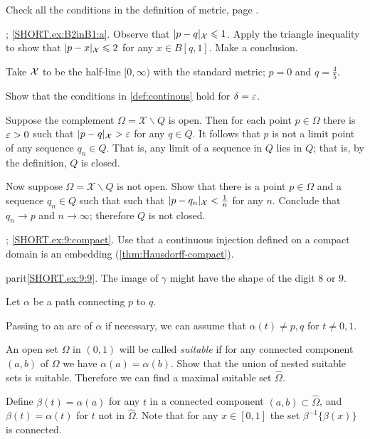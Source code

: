 
\setcounter{eqtn}{0}

 Check all the conditions in the definition of metric, page \pageref{page:def:metric}.

\parbf{\ref{ex:B2inB1}}; \ref{SHORT.ex:B2inB1:a}.
Observe that $|p-q|_{\mathcal{X}}\leqslant 1$. 
Apply the triangle inequality to show that $|p-x|_{\mathcal{X}}\leqslant 2$ for any $x\in B[q,1]$.
Make a conclusion.

 Take $\mathcal{X}$ to be the half-line $[0,\infty)$ with the standard metric; $p=0$ and $q=\tfrac45$.

 Show that the conditions in \ref{def:continous} hold for $\delta=\varepsilon$.

Suppose the complement $\Omega=\mathcal{X}\backslash Q$ is open.
Then for each point $p\in \Omega$ there is $\varepsilon>0$ such that $|p-q|_{\mathcal{X}}>\varepsilon$ for any $q\in Q$.
It follows that $p$ is not a limit point of any sequence $q_n\in Q$.
That is, any limit of a sequence in $Q$ lies in $Q$;
that is, by the definition, $Q$ is closed.

Now suppose $\Omega=\mathcal{X}\backslash Q$ is not open.
Show that there is a point $p\in \Omega$ and a sequence $q_n\in Q$ such that such that $|p-q_n|_{\spc{X}}\z<\tfrac 1n$ for any $n$.
Conclude that $q_n\to p$ and $n\to \infty$;
therefore $Q$ is not closed.


\setcounter{eqtn}{0}

\parbf{\ref{ex:9}}; \ref{SHORT.ex:9:compact}. Use that a continuous injection defined on a compact domain is an embedding (\ref{thm:Hausdorff-compact}).

parit{\ref{SHORT.ex:9:9}.} The image of $\gamma$ might have the shape of the digit $8$ or $9$.



Let $\alpha$ be a path connecting $p$ to $q$.

Passing to an arc of $\alpha$ if necessary,
we can assume that $\alpha(t)\ne p,q$ for $t\ne0,1$.

An open set $\Omega$ in $(0,1)$ will be called {}\emph{suitable}
if for any connected component $(a,b)$ of $\Omega$ we have $\alpha(a)=\alpha(b)$.
Show that the union of nested suitable sets is suitable.
Therefore we can find a maximal suitable set $\hat \Omega$.

Define $\beta(t)=\alpha(a)$ for any $t$ in a connected component $(a,b)\subset\hat \Omega$, and $\beta (t) = \alpha (t) $ for $t$ not in $\hat{\Omega}$.
Note that for any $x\in [0,1]$ the set $\beta^{-1}\{\beta(x)\}$ is connected.

